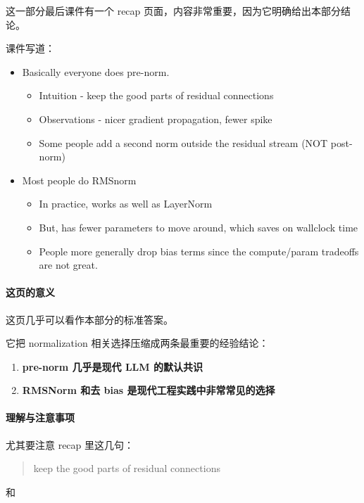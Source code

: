 \documentclass[a4paper,UTF8]{article}
\numberwithin{equation}{section}
\begin{document}
这一部分最后课件有一个 recap 页面，内容非常重要，因为它明确给出本部分结论。

课件写道：

\begin{itemize}
    \item Basically everyone does pre-norm.
    \begin{itemize}
        \item Intuition - keep the good parts of residual connections
        \item Observations - nicer gradient propagation, fewer spike
        \item Some people add a second norm outside the residual stream (NOT post-norm)
    \end{itemize}
    \item Most people do RMSnorm
    \begin{itemize}
        \item In practice, works as well as LayerNorm
        \item But, has fewer parameters to move around, which saves on wallclock time
        \item People more generally drop bias terms since the compute/param tradeoffs are not great.
    \end{itemize}
\end{itemize}

\paragraph{这页的意义}
这页几乎可以看作本部分的标准答案。

它把 normalization 相关选择压缩成两条最重要的经验结论：

\begin{enumerate}
    \item \textbf{pre-norm 几乎是现代 LLM 的默认共识}
    \item \textbf{RMSNorm 和去 bias 是现代工程实践中非常常见的选择}
\end{enumerate}

\paragraph{理解与注意事项}
尤其要注意 recap 里这几句：

\begin{quote}
keep the good parts of residual connections
\end{quote}

和
\end{document}
